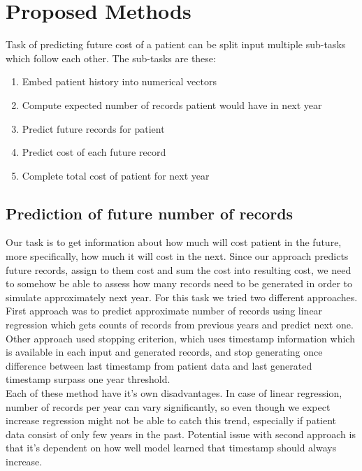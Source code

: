 
\chapter{Proposed Methods}

Task of predicting future cost of a patient can be split input multiple sub-tasks which follow each other. The sub-tasks are these:

\begin{enumerate}
	\item Embed patient history into numerical vectors
	\item Compute expected number of records patient would have in next year
	\item Predict future records for patient
	\item Predict cost of each future record
	\item Complete total cost of patient for next year
\end{enumerate}




\section{Prediction of future number of records}

Our task is to get information about how much will cost patient in the future, more specifically, how much it will cost in the next. Since our approach predicts future records, assign to them cost and sum the cost into resulting cost, we need to somehow be able to assess how many records need to be generated in order to simulate approximately next year. For this task we tried two different approaches.
\\

First approach was to predict approximate number of records using linear regression which gets counts of records from previous years and predict next one. Other approach used stopping criterion, which uses timestamp information which is available in each input and generated records, and stop generating once difference between last timestamp from patient data and last generated timestamp surpass one year threshold.
\\

Each of these method have it's own disadvantages. In case of linear regression, number of records per year can vary significantly, so even though we expect increase \cite{num_of_vis} regression might not be able to catch this trend, especially if patient data consist of only few years in the past. Potential issue with second approach is that it's dependent on how well model learned that timestamp should always increase.  

